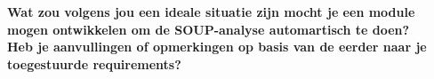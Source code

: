 \textbf{Wat zou volgens jou een ideale situatie zijn mocht je een module mogen ontwikkelen om de SOUP-analyse automartisch te doen?  }
\\

\textbf{Heb je aanvullingen of opmerkingen op basis van de eerder naar je toegestuurde requirements?}
\\



%
%
%
%
